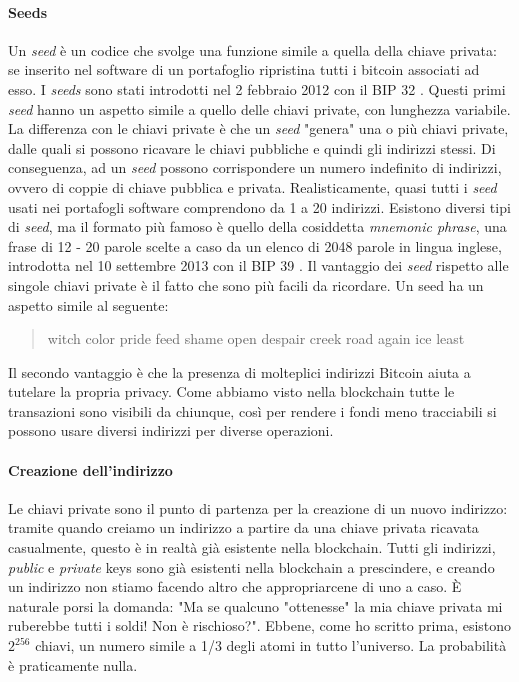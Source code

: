 \documentclass {article}
\begin{document}
\paragraph {Seeds}

Un \textit{seed} è un codice che svolge una funzione simile a quella della chiave privata: se inserito nel software di un portafoglio ripristina tutti i bitcoin associati ad esso.
I \textit{seeds} sono stati introdotti nel 2 febbraio 2012 con il BIP 32 \cite{bip32}.
Questi primi \textit{seed} hanno un aspetto simile a quello delle chiavi private, con lunghezza variabile.
La differenza con le chiavi private è che un \textit{seed} "genera" una o più chiavi private, dalle quali si possono ricavare le chiavi pubbliche e quindi gli indirizzi stessi.
Di conseguenza, ad un \textit{seed} possono corrispondere un numero indefinito di indirizzi, ovvero di coppie di chiave pubblica e privata.
Realisticamente, quasi tutti i \textit{seed} usati nei portafogli software comprendono da 1 a 20 indirizzi.
Esistono diversi tipi di \textit{seed}, ma il formato più famoso è quello della cosiddetta \textit{mnemonic phrase}, una frase di 12 - 20 parole scelte a caso da un elenco di 2048 parole in lingua inglese, introdotta nel 10 settembre 2013 con il BIP 39 \cite{bip39}.
Il vantaggio dei \textit{seed} rispetto alle singole chiavi private è il fatto che sono più facili da ricordare. Un seed ha un aspetto simile al seguente:

\begin{quote}

witch color pride feed shame open despair creek road again ice least

\end{quote}
%
Il secondo vantaggio è che la presenza di molteplici indirizzi Bitcoin aiuta a tutelare la propria privacy.
Come abbiamo visto nella blockchain tutte le transazioni sono visibili da chiunque, così per rendere i fondi meno tracciabili si possono usare diversi indirizzi per diverse operazioni.

\paragraph {Creazione dell'indirizzo}

Le chiavi private sono il punto di partenza per la creazione di un nuovo indirizzo: tramite
quando creiamo un indirizzo a partire da una chiave privata ricavata casualmente, questo è in realtà già esistente nella blockchain.
Tutti gli indirizzi, \textit{public} e \textit{private} keys sono già esistenti nella blockchain a prescindere, e creando un indirizzo non stiamo facendo altro che appropriarcene di uno a caso.
È naturale porsi la domanda: "Ma se qualcuno "ottenesse" la mia chiave privata mi ruberebbe tutti i soldi! Non è rischioso?".
Ebbene, come ho scritto prima, esistono $2^{256}$ chiavi, un numero simile a 1/3 degli atomi in tutto l'universo. La probabilità è praticamente nulla.
\end{document}

